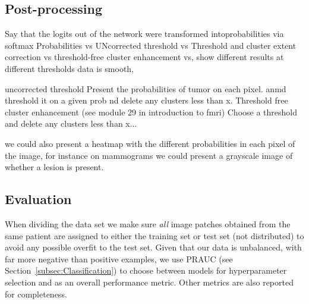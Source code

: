 
\subsection{Post-processing}
Say that the logits out of the network were transformed intoprobabilities via softmax
Probabilities vs UNcorrected threshold vs Threshold and cluster extent correction vs threshold-free cluster enhancement vs, show different results at different thresholds
data is smooth, 

uncorrected threshold
Present the probabilities of tumor on each pixel. anmd threshold it on a given prob nd delete any clusters less than x.
Threshold free cluster enhancement (see module 29 in introduction to fmri)
Choose a threshold and delete any clusters less than x...

we could also present a heatmap with the different probabilities in each pixel of the image, for instance on mammograms we could present a grayscale image of whether a lesion is present.






	\subsection{Evaluation}
	When dividing the data set we make sure \textit{all} image patches obtained from the same patient are assigned to either the training set or test set (not distributed) to avoid any possible overfit to the test set. Given that our data is unbalanced, with far more negative than positive examples, we use PRAUC (see Section~\ref{subsec:Classification}) to choose between models for hyperparameter selection and as an overall performance metric. Other metrics are also reported for completeness. 

